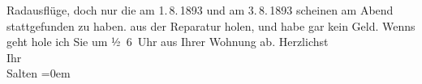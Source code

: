 \begin{ledgroupsized}[t]{13cm}
{{{                  Radausflüge, doch nur die am 1. 8. 1893 und am 3. 8. 1893 scheinen am Abend
                  stattgefunden zu haben.}}}\label{K_L03124-2h} aus der Re{\pb}paratur holen, und habe gar kein
               Geld. Wenns geht hole ich Sie um ½ 6 Uhr aus Ihrer Wohnung ab.\pend
           \pstart
           Herzlichst {\\[\baselineskip]}Ihr {\\[\baselineskip]}\spacefill\mbox{Salten}\pend
           \leftskip=0em{}
         
         \endnumbering{}\end{ledgroupsized}  \newcommand{\dateiname}{L03124}\newcommand{\titel}{Felix Salten an Arthur Schnitzler, [1. oder 3.? 8. 1893]}\newcommand{\editorInnen}{Martin Anton Müller und Laura Untner}
      